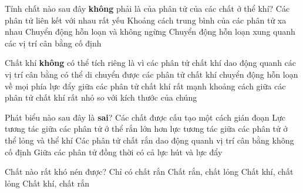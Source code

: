 \begin{ex} 
	Tính chất nào sau đây \textbf{không} phải là của phân tử của các chất ở thể khí?
	\choice
	{Các phân tử liên kết với nhau rất yếu}
	{Khoảng cách trung bình của các phân tử xa nhau}
	{Chuyển động hỗn loạn và không ngừng}
	{\True Chuyển động hỗn loạn xung quanh các vị trí cân bằng cố định}
\end{ex}

\begin{ex} 
	Chất khí \textbf{không} có thể tích riêng là vì
	\choice
	{các phân tử chất khí dao động quanh các vị trí cân bằng có thể di chuyển được}
	{\True các phân tử chất khí chuyển động hỗn loạn về mọi phía}
	{lực đẩy giữa các phân tử chất khí rất mạnh}
	{khoảng cách giữa các phân tử chất khí rất nhỏ so với kích thước của chúng}
\end{ex}


\begin{ex}%
	Phát biểu nào sau đây là \textbf{sai}?
	\choice
	{Các chất được cấu tạo một cách gián đoạn}
	{Lực tương tác giữa các phân tử ở thể rắn lớn hơn lực tương tác giữa các phân tử ở thể lỏng và thể khí}
	{\True Các phân tử chất rắn dao động quanh vị trí cân bằng không cố định}
	{Giữa các phân tử đồng thời có cả lực hút và lực đẩy}
	\end{ex}

\begin{ex}%
	Chất nào rất khó nén được?
	\choice
	{Chỉ có chất rắn}
	{\True Chất rắn, chất lỏng}
	{Chất khí, chất lỏng}
	{Chất khí, chất rắn}
	\end{ex}


